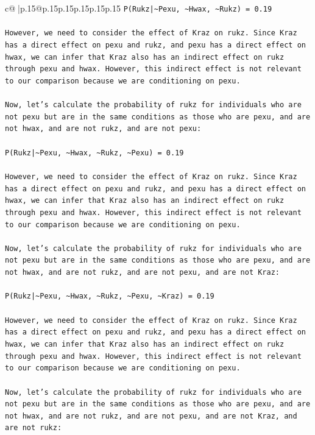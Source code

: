 \documentclass{article}
\begin{document}
{\begin{supertabular}{c@{$\;$}|p{.15\linewidth}@{}p{.15\linewidth}p{.15\linewidth}p{.15\linewidth}p{.15\linewidth}p{.15\linewidth}}
{{{\texttt{P(Rukz|\textasciitilde{}Pexu, \textasciitilde{}Hwax, \textasciitilde{}Rukz) = 0.19} \\
\\ 
\texttt{However, we need to consider the effect of Kraz on rukz. Since Kraz has a direct effect on pexu and rukz, and pexu has a direct effect on hwax, we can infer that Kraz also has an indirect effect on rukz through pexu and hwax. However, this indirect effect is not relevant to our comparison because we are conditioning on pexu.} \\
\\ 
\texttt{Now, let's calculate the probability of rukz for individuals who are not pexu but are in the same conditions as those who are pexu, and are not hwax, and are not rukz, and are not pexu:} \\
\\ 
\texttt{P(Rukz|\textasciitilde{}Pexu, \textasciitilde{}Hwax, \textasciitilde{}Rukz, \textasciitilde{}Pexu) = 0.19} \\
\\ 
\texttt{However, we need to consider the effect of Kraz on rukz. Since Kraz has a direct effect on pexu and rukz, and pexu has a direct effect on hwax, we can infer that Kraz also has an indirect effect on rukz through pexu and hwax. However, this indirect effect is not relevant to our comparison because we are conditioning on pexu.} \\
\\ 
\texttt{Now, let's calculate the probability of rukz for individuals who are not pexu but are in the same conditions as those who are pexu, and are not hwax, and are not rukz, and are not pexu, and are not Kraz:} \\
\\ 
\texttt{P(Rukz|\textasciitilde{}Pexu, \textasciitilde{}Hwax, \textasciitilde{}Rukz, \textasciitilde{}Pexu, \textasciitilde{}Kraz) = 0.19} \\
\\ 
\texttt{However, we need to consider the effect of Kraz on rukz. Since Kraz has a direct effect on pexu and rukz, and pexu has a direct effect on hwax, we can infer that Kraz also has an indirect effect on rukz through pexu and hwax. However, this indirect effect is not relevant to our comparison because we are conditioning on pexu.} \\
\\ 
\texttt{Now, let's calculate the probability of rukz for individuals who are not pexu but are in the same conditions as those who are pexu, and are not hwax, and are not rukz, and are not pexu, and are not Kraz, and are not rukz:} \\
}}}
\end{supertabular}}
\end{document}

